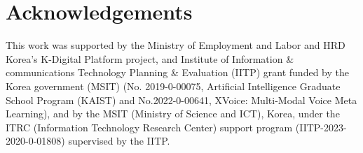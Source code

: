 \documentclass{INTERSPEECH2023}
\begin{document}
%
 
\vspace{-3pt}
\section{Acknowledgements}
\vspace{-1pt}
This work was supported by the Ministry of Employment and Labor and HRD Korea's K-Digital Platform project, and Institute of Information \& communications Technology Planning \& Evaluation (IITP) grant funded by the Korea government (MSIT) (No. 2019-0-00075, Artificial Intelligence Graduate School Program (KAIST) and No.2022-0-00641, XVoice: Multi-Modal Voice Meta Learning), and by the MSIT (Ministry of Science and ICT), Korea, under the ITRC (Information Technology Research Center) support program (IITP-2023-2020-0-01808) supervised by the IITP.









\end{document}
